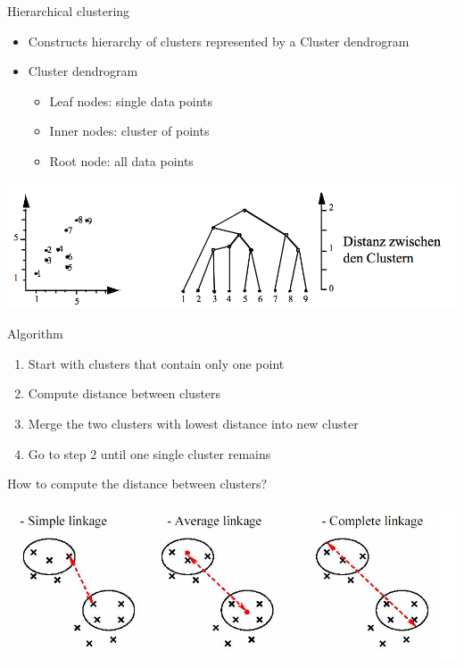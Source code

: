 \documentclass{beamer}\usepackage[]{graphicx}\usepackage[]{color}
\begin{document}
\begin{frame}[fragile]{Hierarchical clustering}
  \begin{itemize}
    \item Constructs hierarchy of clusters represented by a \alert{Cluster dendrogram}
    \item \alert{Cluster dendrogram}
      \begin{itemize}
        \item Leaf nodes: single data points
        \item Inner nodes: cluster of points
        \item Root node: all data points
      \end{itemize}
  \end{itemize}
  \begin{center}
    \includegraphics[width=.8\linewidth]{clust_dendro.png}
  \end{center}
\end{frame}

\begin{frame}[fragile]{Algorithm}
  \begin{enumerate}
    \item Start with clusters that contain only one point
    \item Compute distance between clusters
    \item Merge the two clusters with lowest distance into new cluster
    \item Go to step 2 until one single cluster remains
  \end{enumerate}
\end{frame}

\begin{frame}[fragile]{How to compute the distance between clusters?}
  \begin{center}
    \includegraphics[width=\linewidth]{clust_linkage.jpg}
  \end{center}
\end{frame}
\end{document}
